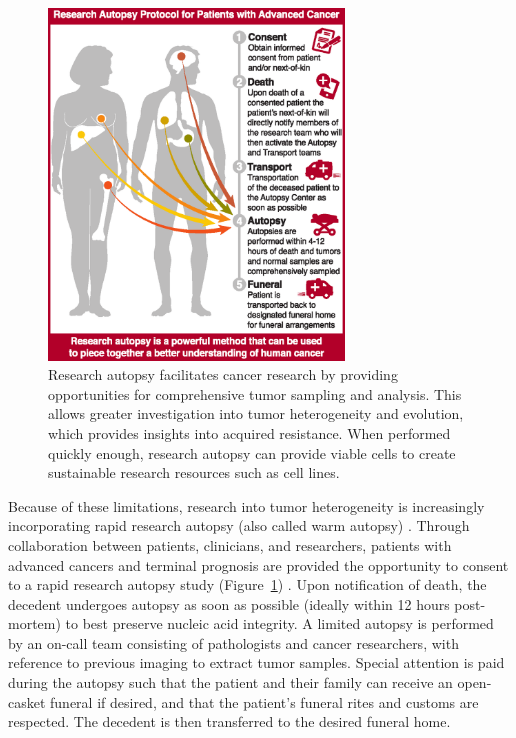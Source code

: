 \begin{figure}[tbhp]
    \centering
    \includegraphics[width=0.7\textwidth,keepaspectratio]{images/intro/autopsy_puzzle_pieces}
    \vspace{-0.3cm}
    \caption[Research autopsy facilitates cancer research.]{Research autopsy facilitates cancer research by providing opportunities for comprehensive tumor sampling and analysis. This allows greater investigation into tumor heterogeneity and evolution, which provides insights into acquired resistance. When performed quickly enough, research autopsy can provide viable cells to create sustainable research resources such as cell lines.}
    \label{fig:intro:autopsy_puzzle_pieces}
\end{figure}
Because of these limitations, research into tumor heterogeneity is increasingly incorporating rapid research autopsy (also called warm autopsy) \cite{duregon2019}. Through collaboration between patients, clinicians, and researchers, patients with advanced cancers and terminal prognosis are provided the opportunity to consent to a rapid research autopsy study (Figure~\ref{fig:intro:autopsy_puzzle_pieces}) \cite{krook2019_review}. Upon notification of death, the decedent undergoes autopsy as soon as possible (ideally within 12 hours post-mortem) to best preserve nucleic acid integrity. A limited autopsy is performed by an on-call team consisting of pathologists and cancer researchers, with reference to previous imaging to extract tumor samples. Special attention is paid during the autopsy such that the patient and their family can receive an open-casket funeral if desired, and that the patient's funeral rites and customs are respected. The decedent is then transferred to the desired funeral home.

